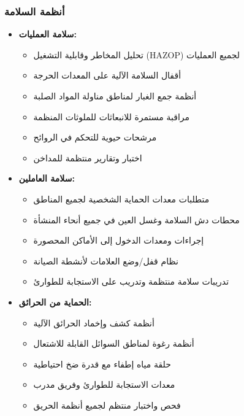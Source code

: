 \subsubsection{أنظمة السلامة}
\begin{itemize}
    \item \textbf{سلامة العمليات:}
    \begin{itemize}
        \item تحليل المخاطر وقابلية التشغيل (HAZOP) لجميع العمليات
        \item أقفال السلامة الآلية على المعدات الحرجة
        \item أنظمة جمع الغبار لمناطق مناولة المواد الصلبة
        \item مراقبة مستمرة للانبعاثات للملوثات المنظمة
        \item مرشحات حيوية للتحكم في الروائح
        \item اختبار وتقارير منتظمة للمداخن
    \end{itemize}
    
    \item \textbf{سلامة العاملين:}
    \begin{itemize}
        \item متطلبات معدات الحماية الشخصية لجميع المناطق
        \item محطات دش السلامة وغسل العين في جميع أنحاء المنشأة
        \item إجراءات ومعدات الدخول إلى الأماكن المحصورة
        \item نظام قفل/وضع العلامات لأنشطة الصيانة
        \item تدريبات سلامة منتظمة وتدريب على الاستجابة للطوارئ
    \end{itemize}
    
    \item \textbf{الحماية من الحرائق:}
    \begin{itemize}
        \item أنظمة كشف وإخماد الحرائق الآلية
        \item أنظمة رغوة لمناطق السوائل القابلة للاشتعال
        \item حلقة مياه إطفاء مع قدرة ضخ احتياطية
        \item معدات الاستجابة للطوارئ وفريق مدرب
        \item فحص واختبار منتظم لجميع أنظمة الحريق
    \end{itemize}
\end{itemize}

